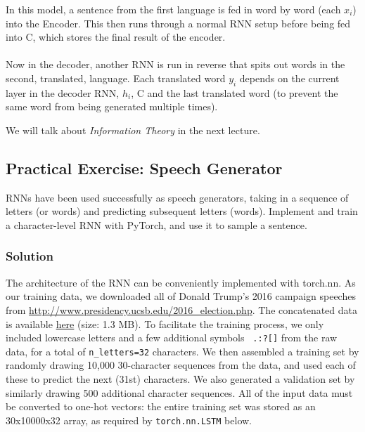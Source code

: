 \documentclass{article}
\begin{document}
In this model, a sentence from the first language is fed in word by word (each $x_i$) into the Encoder. This then runs through a normal RNN setup before being fed into C, which stores the final result of the encoder. 
\\ \\ \noindent 
Now in the decoder, another RNN is run in reverse that spits out words in the second, translated, language. Each translated word  $y_i$ depends on the current layer in the decoder RNN, $h_i$, C and the last translated word (to prevent the same word from being generated multiple times). 
\begin{remark}
We will talk about \emph{Information Theory} in the next lecture.

\subsection{Practical Exercise: Speech Generator}

RNNs have been used successfully as speech generators, taking in a sequence of letters (or words) and predicting subsequent letters (words). Implement and train a character-level RNN with PyTorch, and use it to sample a sentence.

\subsubsection{Solution}

The architecture of the RNN can be conveniently implemented with torch.nn. As our training data, we downloaded all of Donald Trump's 2016 campaign speeches from \url{http://www.presidency.ucsb.edu/2016_election.php}. The concatenated data is available \href{run:speeches_concat.txt}{here} (size: 1.3 MB). To facilitate the training process, we only included lowercase letters and a few additional symbols \verb| .:?[]| from the raw data, for a total of \verb|n_letters=32| characters. We then assembled a training set by randomly drawing 10,000 30-character sequences from the data, and used each of these to predict the next (31st) characters. We also generated a validation set by similarly drawing 500 additional character sequences. All of the input data must be converted to one-hot vectors: the entire training set was stored as an 30x10000x32 array, as required by \verb|torch.nn.LSTM| below.


\end{remark}
\end{document}
